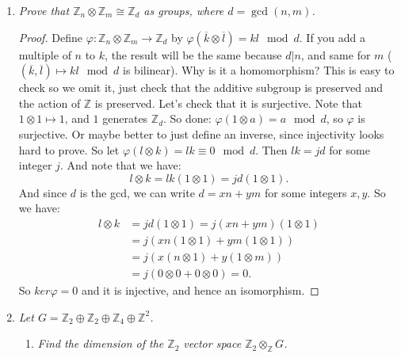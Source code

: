 \documentclass[9pt,reqno,twoside]{amsbook}
\theoremstyle{plain}
\numberwithin{section}{chapter}
\numberwithin{equation}{chapter}
\theoremstyle{definition}
\theoremstyle{remark}
\theoremstyle{plain}
\newcommand{\z}{\mathbb{Z}}
\newcommand{\bb}{\vspace{3mm}}
\newcommand{\bee}{\begin{equation}\begin{aligned}}
\newcommand{\eee}{\end{aligned}\end{equation}}
\newcommand{\tens}{\otimes}
\renewcommand{\bar}{\overline}%
\renewcommand{\phi}{\varphi}
\begin{document}
\begin{enumerate}[label=\arabic*.]
\begin{enumerate}
\begin{proof}
 So for any $u$, there exists a nonzero $a$ s.t. $a\bar{u} \in RB$, so $au + c_1v_1 + \cdots c_kv_k = 0$ for some $c_i \in R,v_i \in B$. Hence $a\bar{u} = 0 \in M/RB$, and thus $M/RB$ is a torsion module. 
\end{proof}

\begin{proof}
Leibman's proof. $M/RB$ is torsion module. If $v \in M$ is such that $av \neq 0 \mod RB$ $\forall a \neq 0$, then $B \cup \Set{v}$ is linearly independent. Why? If $av + \sum a_\alpha v_\alpha = 0$ for some $a_\alpha,v_\alpha \in B$, then $a = 0$, so... Done. If $R$ has zero divisors then no element is linearly dependent, so you cannot find them, since we can divide 0. So must have $R$ is an integral domain. 
\end{proof}
\end{enumerate}
\bb

\item \textit{Prove that $\z_n \tens \z_m \cong \z_d$ as groups, where $d = \gcd(n,m)$. }

\begin{proof}
Define $\phi: \z_n \tens \z_m \to \z_d$ by $\phi(\bar{k}\tens \bar{l}) = kl \mod d$. If you add a multiple of $n$ to $k$, the result will be the same because $d|n$, and same for $m$ ($(\bar{k},\bar{l}) \mapsto kl \mod d$ is bilinear). Why is it a homomorphism? This is easy to check so we omit it, just check that the additive subgroup is preserved and the action of $\z$ is preserved.  Let's check that it is surjective. Note that $1 \tens 1 \mapsto 1$, and $1$ generates $\z_d$. So done: $\phi(1 \tens a) = a \mod d$, so $\phi$ is surjective. Or maybe better to just define an inverse, since injectivity looks hard to prove. So let $\phi(l \tens k) = lk \equiv 0 \mod d$. Then $lk = jd$ for some integer $j$. And note that we have:
$$
l \tens k = lk(1 \tens 1) = jd(1 \tens 1).
$$
And since $d$ is the gcd, we can write $d = xn + ym$ for some integers $x,y$. So we have:
\bee
l \tens k &= jd(1 \tens 1) = j(xn + ym)(1 \tens 1)\\
&= j(xn(1 \tens 1) + ym(1 \tens 1))\\
&= j(x(n \tens 1) + y(1 \tens m))\\
&= j(0 \tens 0 + 0 \tens 0) = 0.
\eee
So $ker\phi = 0$ and it is injective, and hence an isomorphism. 
\end{proof}
\bb

\item \textit{Let $G = \z_2 \oplus \z_2 \oplus \z_4 \oplus \z^2$. }
\begin{enumerate}
\item \textit{Find the dimension of the $\z_2$ vector space $\z_2 \tens_\z G$. }


\end{enumerate}
\end{enumerate}
\end{document}
